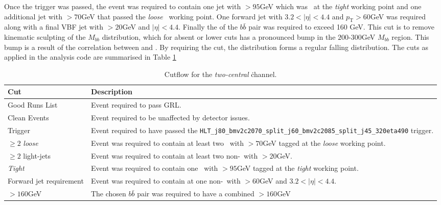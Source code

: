 		Once the trigger was passed, the event was required to contain one jet with \pt$>95$GeV which was \btagged\, at the \textit{tight} working point and one additional jet with \pt$>70$GeV that passed the \textit{loose} \btag\, working point. One forward jet with $3.2 < |\eta| < 4.4$ and $p_{\text{T}}>60$GeV was required along with a final VBF jet with \pt$>20$GeV and $|\eta| < 4.4$. Finally the \pt of the $b\bar{b}$ pair was required to exceed 160 GeV. This cut is to remove kinematic sculpting of the $M_{bb}$ distribution, which for absent or lower \ptbb cuts has a pronounced bump in the $200$-$300$GeV $M_{bb}$ region. This bump is a result of the correlation between \mbb and \ptbb. By requiring the \ptbb cut, the \mbb distribution forms a regular falling distribution. The cuts as applied in the analysis code are summarised in Table \ref{tab:cuts}

		\begin{table}[h]
		\caption[\textit{Two-central} channel event cuts]{Cutflow for the \textit{two-central} \VBFHBB\. channel.}
		\label{tab:cuts}
		\medskip
		\centering
		\begin{tabularx}{\textwidth}{p{2.5cm} X}\toprule
			Cut & Description \\\midrule
			Good Runs List & Event required to pass GRL.\\
			Clean Events & Event required to be unaffected by detector issues.\\
			Trigger & Event required to have passed the \texttt{HLT\_j80\_bmv2c2070\_split\_\-j60\_bmv2c2085\_split\_j45\_320eta490} trigger.\\
			$\geq2$ \textit{loose} & Event was required to contain at least two \bjets\ with \pt$>70$GeV tagged at the \textit{loose} working point.\\
			$\geq2$ light-jets & Event was required to contain at least two non-\bjets\ with \pt$>20$GeV.\\
			\textit{Tight} \bjet & Event was required to contain one \bjet\ with \pt$>95$GeV tagged at the \textit{tight} working point.\\
			Forward jet requirement & Event was required to contain at one non-\bjet\ with \pt$>60$GeV and $3.2 < |\eta| < 4.4$.\\
			\ptbb$>160$GeV & The chosen $b\bar{b}$ pair was required to have a combined \pt$>160$GeV \\
			\bottomrule
		\end{tabularx}
	\end{table}

